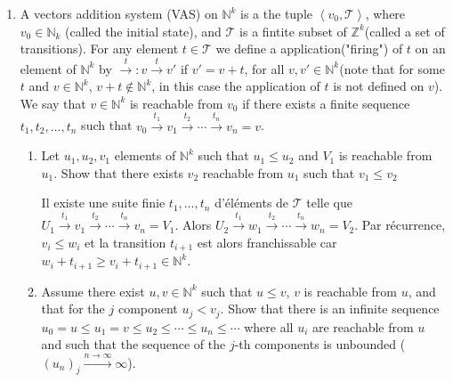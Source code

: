 \documentclass[a4paper,11pt]{exam}
\newcommand{\Z}{\mathbb{Z}}
\newcommand{\N}{\mathbb{N}}
\begin{document}
\begin{questions}
\begin{enumerate}
			\newcommand{\T}{\mathcal{T}}
			\item A vectors addition system (VAS) on $\N^k$ is a the tuple $\left\langle v_0, \mathcal{T}\right\rangle $, where $v_0\in \N_k$ (called the initial state), and $\mathcal{T}$ is a fintite subset of $\Z^k$(called a set of transitions). For any element $t\in\mathcal{T}$ we define a application("firing") of $t$ on an element of $\N^k$ by $\xrightarrow{t}:v\xrightarrow{t}v'$ if $v'=v+t$, for all $v,v'\in \N^k$(note that for some $t$ and $v\in\N^k$, $v+t\notin\N^k $, in this case the application of $t$ is not defined on $v$).
			We say that $v\in\N^k$ is reachable from $v_0$ if there exists a finite sequence $t_1,t_2,\ldots,t_n$ such that $v_0 \stackrel{t_1}{\to} v_1 \stackrel{t_2}{\to} \cdots \stackrel{t_n}{\to} v_n=v$.
			
			
			\begin{enumerate}
				\item Let $u_1,u_2, v_1$ elements of $\N^k$ such that  $u_1 \leq u_2$ and $V_1$ is reachable from $u_1$.
				Show that there exists $v_2$ reachable from $u_1$ such that $v_1 \leq v_2$
				\begin{solution}
					Il existe une suite finie $t_1, \dots, t_n$ d'éléments de $\T$
					telle que $U_1 \xrightarrow{t_1} v_1 \xrightarrow{t_2} \cdots
					\xrightarrow{t_n} v_n = V_1$.
					Alors $U_2 \xrightarrow{t_1} w_1 \xrightarrow{t_2} \cdots
					\xrightarrow{t_n} w_n = V_2$.
					Par récurrence, $v_i \leq w_i$ et la transition $t_{i+1}$ est alors
					franchissable car $w_i + t_{i+1} \geq v_i + t_{i+1} \in \N^k$.
				\end{solution}
				
				\item Assume there exist $u,v\in\N^k$ such that $u\leq v$, $v$ is reachable from $u$, and that for the $j$ component $u_j< v_j$. 
				Show that there is an infinite sequence  $u_0 = u\leq u_1 = v \leq u_2 \leq \cdots \leq u_n \leq \cdots $ where all $u_i$ are reachable from $u$ and such that the sequence of the $ j $-th components is unbounded ($(u_n)_j\xrightarrow{n\rightarrow\infty}\infty$).
				

\end{enumerate}
\end{enumerate}
\end{questions}
\end{document}
